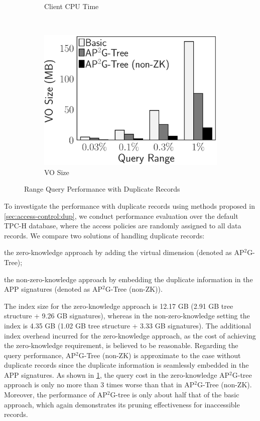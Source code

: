 \begin{figure}[t]
\begin{subfigure}{.33\linewidth}
        \caption{Client CPU Time}
    \end{subfigure}~%
    \begin{subfigure}{.33\linewidth}
        \includegraphics[height=\ht\figbox]{exp-figs/access-control/dup_vo.eps}
        \caption{VO Size}
    \end{subfigure}
    \caption{Range Query Performance with Duplicate Records}\label{exp-fig:access-control:dup}
\end{figure}

To investigate the performance with duplicate records using methods proposed in \cref{sec:access-control:dup}, we conduct performance evaluation over the default TPC-H database, where the access policies are randomly assigned to all data records.
We compare two solutions of handling duplicate records:
\begin{inlineenum}
    \item the zero-knowledge approach by adding the virtual dimension (denoted as AP$^2$G-Tree);
    \item the non-zero-knowledge approach by embedding the duplicate information in the APP signatures (denoted as AP$^2$G-Tree (non-ZK)).
\end{inlineenum}
The index size for the zero-knowledge approach is 12.17 GB (2.91 GB tree structure + 9.26 GB signatures), whereas in the non-zero-knowledge setting the index is 4.35 GB (1.02 GB tree structure + 3.33 GB signatures). The additional index overhead incurred for the zero-knowledge approach, as the cost of achieving the zero-knowledge requirement, is believed to be reasonable. Regarding the query performance, AP$^2$G-Tree (non-ZK) is approximate to the case without duplicate records since the duplicate information is seamlessly embedded in the APP signatures. As shown in \cref{exp-fig:access-control:dup}, the query cost in the zero-knowledge AP$^2$G-tree approach is only no more than 3 times worse than that in AP$^2$G-Tree (non-ZK). Moreover, the performance of AP$^2$G-tree is only about half that of the basic approach, which again demonstrates its pruning effectiveness for inaccessible records.

